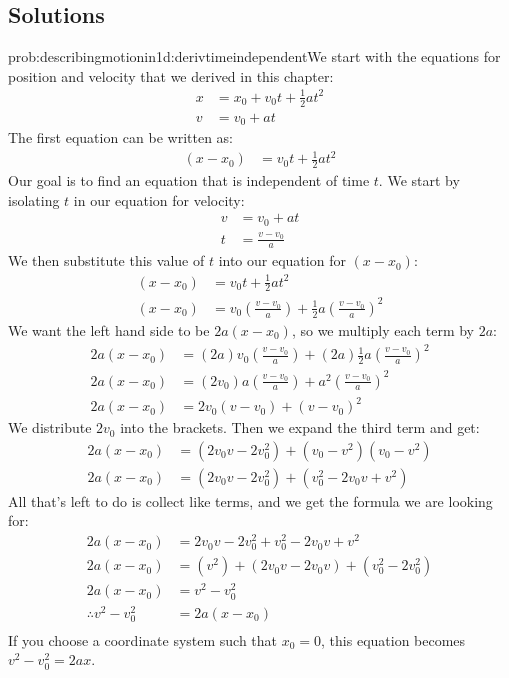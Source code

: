 \subsection{Solutions}
\begin{solution}{prob:describingmotionin1d:derivtimeindependent}\label{soln:describingmotionin1d:derivtimeindependent}We start with the equations for position and velocity that we derived in this chapter:
\begin{align*}
x&=x_0+v_0t+\frac{1}{2}at^2\\
v&=v_0+at
\end{align*}
The first equation can be written as:
\begin{align*}
(x-x_0)&=v_0t+\frac{1}{2}at^2
\end{align*}
Our goal is to find an equation that is independent of time $t$. We start by isolating $t$ in our equation for velocity:
\begin{align*}
v&=v_0+at\\
t&=\frac{v-v_0}{a}
\end{align*}
We then substitute this value of $t$ into our equation for $(x-x_0)$:
\begin{align*}
(x-x_0)&=v_0t+\frac{1}{2}at^2\\
(x-x_0)&=v_0\left(\frac{v-v_0}{a}\right)+\frac{1}{2}a\left(\frac{v-v_0}{a}\right)^2
\end{align*}
We want the left hand side to be $2a(x-x_0)$, so we multiply each term by $2a$:
\begin{align*}
2a(x-x_0)&=(2a)v_0\left( \frac{v-v_0}{a}\right) +(2a)\frac{1}{2}a\left( \frac{v-v_0}{a}\right) ^2\\
2a(x-x_0)&=(2v_0)a\left(\frac{v-v_0}{a}\right)+a^2\left( \frac{v-v_0}{a}\right) ^2\\
2a(x-x_0)&=2v_0(v-v_0)+(v-v_0)^2
\end{align*}
We distribute $2v_0$ into the brackets. Then we expand the third term and get:
\begin{align*}
2a(x-x_0)&=(2v_0v-2v_0^2)+(v_0-v^2)(v_0-v^2)\\
2a(x-x_0)&=(2v_0v-2v_0^2)+(v_0^2-2v_0v+v^2)
\end{align*}
All that's left to do is collect like terms, and we get the formula we are looking for:
\begin{align*}
2a(x-x_0)&=2v_0v-2v_0^2+v_0^2-2v_0v+v^2\\
2a(x-x_0)&=(v^2)+(2v_0v-2v_0v)+(v_0^2-2v_0^2)\\
2a(x-x_0)&=v^2-v_0^2\\
\therefore v^2-v_0^2&=2a(x-x_0)\\
\end{align*}
If you choose a coordinate system such that $x_0=0$, this equation becomes $v^2-v_0^2=2ax$.
\end{solution}

